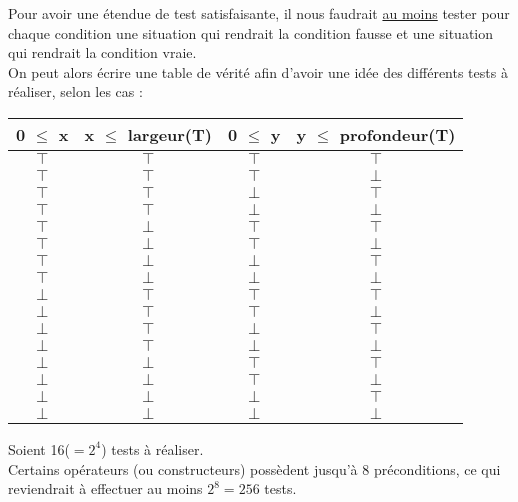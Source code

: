 \documentclass[a4paper, 11pt, notitlepage]{article}
\begin{document}
 Pour avoir une étendue de test satisfaisante, il nous faudrait \underline{au moins} tester pour chaque condition une situation qui rendrait la condition fausse et une situation qui rendrait la condition vraie. \\
 
 On peut alors écrire une table de vérité afin d'avoir une idée des différents tests à réaliser, selon les cas :
 
 \begin{center}
   \begin{tabular}{ | c | c | c | c |}
     \hline
     0 $\le$ x &  x $\le$ largeur(T) & 0 $\le$ y &  y $\le$ profondeur(T) \\ \hline
    $\top$ & $\top$ & $\top$ & $\top$ \\ \hline
    $\top$ & $\top$ & $\top$ & $\bot$ \\ \hline
    $\top$ & $\top$ & $\bot$ & $\top$ \\ \hline
    $\top$ & $\top$ & $\bot$ & $\bot$ \\ \hline
    $\top$ & $\bot$ & $\top$ & $\top$ \\ \hline
    $\top$ & $\bot$ & $\top$ & $\bot$ \\ \hline
    $\top$ & $\bot$ & $\bot$ & $\top$ \\ \hline
    $\top$ & $\bot$ & $\bot$ & $\bot$ \\ \hline
    
    $\bot$ & $\top$ & $\top$ & $\top$ \\ \hline
    $\bot$ & $\top$ & $\top$ & $\bot$ \\ \hline
    $\bot$ & $\top$ & $\bot$ & $\top$ \\ \hline
    $\bot$ & $\top$ & $\bot$ & $\bot$ \\ \hline
    $\bot$ & $\bot$ & $\top$ & $\top$ \\ \hline
    $\bot$ & $\bot$ & $\top$ & $\bot$ \\ \hline
    $\bot$ & $\bot$ & $\bot$ & $\top$ \\ \hline
    $\bot$ & $\bot$ & $\bot$ & $\bot$ \\ \hline

   \end{tabular}
 \end{center}

Soient 16($=2^4$) tests à réaliser.  \\

Certains opérateurs (ou constructeurs) possèdent jusqu'à 8 préconditions, ce qui reviendrait à effectuer au moins $2^8=256$ tests. \\
\end{document}
